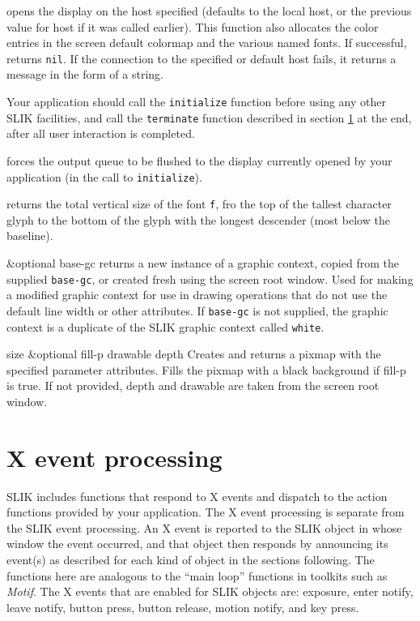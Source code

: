 \documentclass[twoside,openright,11pt]{report}
\newcommand{\tp}[1]{\texttt{#1}}
\begin{document}
{opens the display on the host specified (defaults to the local host,
or the previous value for host if it was called earlier).  This
function also allocates the color entries in the screen default
colormap and the various named fonts.  If successful, returns
\tp{nil}.  If the connection to the specified or default host fails,
it returns a message in the form of a string.}

Your application should call the \tp{initialize} function before using
any other SLIK facilities, and call the \tp{terminate} function
described in section \ref{sec:xeventfns} at the end, after all user
interaction is completed.

{forces the output queue to be flushed to the display currently opened
by your application (in the call to \tp{initialize}).}

{returns the total vertical size of the font \tp{f}, fro the top of
the tallest character glyph to the bottom of the glyph with the
longest descender (most below the baseline).}

{\&optional base-gc}
{returns a new instance of a graphic context, copied from the supplied
\tp{base-gc}, or created fresh using the screen root window.  Used for
making a modified graphic context for use in drawing operations that
do not use the default line width or other attributes.  If
\tp{base-gc} is not supplied, the graphic context is a duplicate of
the SLIK graphic context called \tp{white}.}

{size \&optional fill-p drawable depth}
{Creates and returns a pixmap with the specified parameter attributes.
Fills the pixmap with a black background if fill-p is true.  If not
provided, depth and drawable are taken from the screen root window.}

\section{X event processing} \label{sec:xeventfns}

SLIK includes functions that respond to X events and dispatch to the
action functions provided by your application.  The X event processing
is separate from the SLIK event processing.  An X event is reported to
the SLIK object in whose window the event occurred, and that object
then responds by announcing its event(s) as described for each kind of
object in the sections following.  The functions here are analogous to
the ``main loop'' functions in toolkits such as \textit{Motif}.  The X
events that are enabled for SLIK objects are: exposure, enter notify,
leave notify, button press, button release, motion notify, and key
press.
\end{document}
